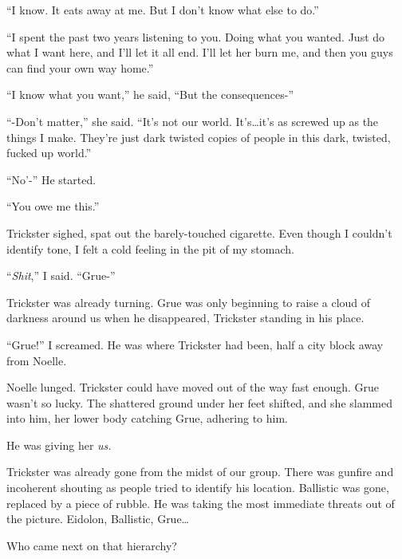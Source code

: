 ``I know.  It eats away at me.  But I don't know what else to do.''



``I spent the past two years listening to you.  Doing what you wanted.  Just do what I want here, and I'll let it all end.  I'll let her burn me, and then you guys can find your own way home.''



``I know what you want,'' he said, ``But the consequences-''



``-Don't matter,'' she said.  ``It's not our world.  It's\ldots it's as screwed up as the things I make.  They're just dark twisted copies of people in this dark, twisted, fucked up world.''



``No'-'' He started.



``You owe me this.''



Trickster sighed, spat out the barely-touched cigarette.  Even though I couldn't identify tone, I felt a cold feeling in the pit of my stomach.



``\emph{Shit},'' I said.  ``Grue-''



Trickster was already turning.  Grue was only beginning to raise a cloud of darkness around us when he disappeared, Trickster standing in his place.



``Grue!'' I screamed.  He was where Trickster had been, half a city block away from Noelle.



Noelle lunged.  Trickster could have moved out of the way fast enough.  Grue wasn't so lucky.  The shattered ground under her feet shifted, and she slammed into him, her lower body catching Grue, adhering to him.



He was giving her\emph{ us.}



Trickster was already gone from the midst of our group. There was gunfire and incoherent shouting as people tried to identify his location.  Ballistic was gone, replaced by a piece of rubble.  He was taking the most immediate threats out of the picture.  Eidolon, Ballistic, Grue\ldots



Who came next on that hierarchy?



